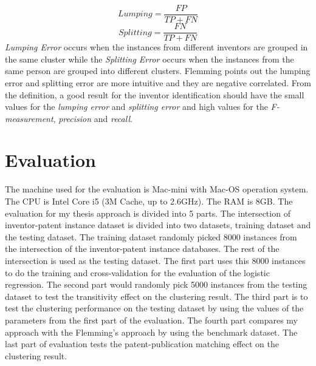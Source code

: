 \begin{equation}
Lumping=\frac{FP}{TP+FN}
\end{equation}
\begin{equation}
Splitting=\frac{FN}{TP+FN}
\end{equation}
\emph{Lumping Error} occurs when the instances from different inventors are grouped in the same cluster while the \emph{Splitting Error} occurs when the instances from the same person are grouped into different clusters. Flemming points out the lumping error and splitting error are more intuitive and they are negative correlated. From the definition, a good result for the inventor identification should have the small values for the \emph{lumping error} and \emph{splitting error} and high values for the \emph{F-measurement}, \emph{precision} and \emph{recall}.

\section{Evaluation}
The machine used for the evaluation is Mac-mini with Mac-OS operation system. The CPU is Intel Core i5 (3M Cache, up to 2.6GHz). The RAM is 8GB. The evaluation for my thesis approach is divided into 5 parts. The intersection of inventor-patent instance dataset is divided into two datasets, training dataset and the testing dataset. The training dataset randomly picked 8000 instances from the intersection of the inventor-patent instance databases. The rest of the intersection is used as the testing dataset. The first part uses this 8000 instances to do the training and cross-validation for the evaluation of the logistic regression. The second part would randomly pick 5000 instances from the testing dataset to test the transitivity effect on the clustering result. The third part is to test the clustering performance on the testing dataset by using the values of the parameters from the first part of the evaluation.   The fourth part  compares my approach with the Flemming's approach by using the benchmark dataset. The last part of evaluation tests the patent-publication matching effect on the clustering result.

